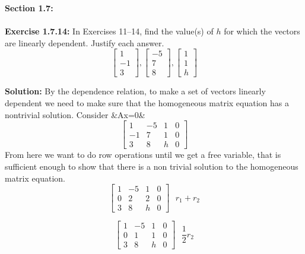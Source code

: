 \documentclass{amsart}
\begin{document}
\thispagestyle{fancy}


{\huge\textbf{Section 1.7:}}\\\\
\noindent\textbf{Exercise 1.7.14: } In Exercises 11–14, find the value(s) of $h$ for which the vectors are linearly dependent. Justify each answer.
\begin{equation}
\begin{bmatrix} 
1\\
-1\\
3
\end{bmatrix},
\begin{bmatrix} 
-5\\
7\\
8
\end{bmatrix},
\begin{bmatrix} 
1\\
1\\
h
\end{bmatrix}
\end{equation}

 
\noindent \textbf{Solution: }By the dependence relation, to make a set of vectors linearly dependent we need to make sure that the homogeneous matrix equation has a nontrivial solution. Consider &Ax=0&\\
\begin{equation}
\begin{bmatrix} 
1&-5&1&0\\
-1&7&1&0\\
3&8&h&0
\end{bmatrix}
\end{equation}
From here we want to do row operations until we get a free variable, that is sufficient enough to show that there is a non trivial solution to the homogeneous matrix equation.\\
\begin{equation}
\begin{bmatrix} 
1&-5&1&0\\
0&2&2&0\\
3&8&h&0
\end{bmatrix}\text{ $r_{1}+r_{2}$}
\end{equation}

\begin{equation}
\begin{bmatrix} 
1&-5&1&0\\
0&1&1&0\\
3&8&h&0
\end{bmatrix}\text{ $\frac{1}{2}r_{2}$}
\end{equation}
\end{document}
